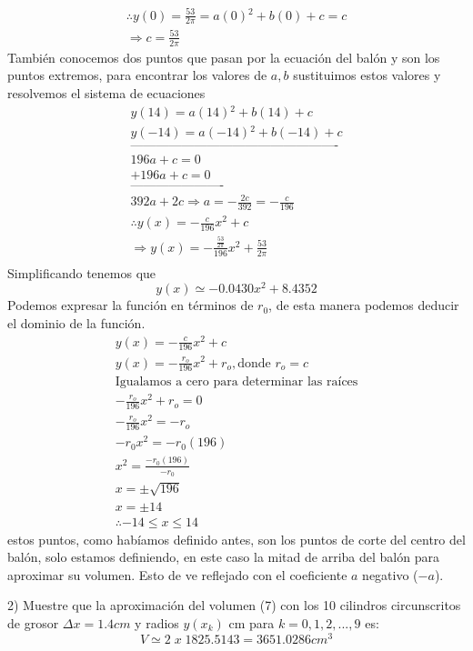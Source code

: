 \begin{gather*}
\therefore y(0)=\frac{53}{2\pi}=a(0){^2}+b(0)+c=c\\
\Rightarrow c=\frac{53}{2\pi}
\end{gather*}
También conocemos dos puntos que pasan por la ecuación del balón y son los puntos extremos, para encontrar los valores de $a,b$ sustituimos estos valores y resolvemos el sistema de ecuaciones
\begin{gather*}
y(14)=a(14){^2}+b(14)+c\\
y(-14)=a(-14){^2}+b(-14)+c\\
\text{-------------------------------------------------}\\
196a+c=0\\
+196a+c=0\\
\text{----------------------}\\
392a+2c\Rightarrow a=-\frac{2c}{392}=-\frac{c}{196}\\
\therefore y(x)=-\frac{c}{196}x{^2}+c\\
\Rightarrow y(x)=-\frac{\frac{53}{2\pi}}{196}x{^2}+\frac{53}{2\pi}\\
\end{gather*}
Simplificando tenemos que $$y(x)\simeq-0.0430x{^2}+8.4352$$
Podemos expresar la función en términos de $r_0$, de esta manera podemos deducir el dominio de la función.
\begin{gather*}
y(x)=-\frac{c}{196}x{^2}+c\\
y(x)=-\frac{r_{o}}{196}x{^2}+r_{o},\text{donde }r_o=c\\
\text{Igualamos a cero para determinar las raíces}\\
-\frac{r_{o}}{196}x{^2}+r_{o}=0\\
-\frac{r_{o}}{196}x{^2}=-r_{o}\\
-r_{0}x{^2}=-r_{0}(196)\\
x{^2}=\frac{-r_{0}(196)}{-r_{0}}\\
x=\pm \sqrt{196}\\
x=\pm 14\\
\therefore-14\leq x\leq 14
\end{gather*}
estos puntos, como habíamos definido antes, son los puntos de corte del centro del balón, solo estamos definiendo, en este caso la mitad de arriba del balón para aproximar su volumen. Esto de ve reflejado con el coeficiente $a$ negativo ($-a$).

2) Muestre que la aproximación del volumen (7) con los 10 cilindros circunscritos de grosor $\Delta x = 1.4 cm$ y radios $y(x_{k})$ cm para $k = 0, 1, 2, . . . , 9$ es:
$$V\simeq 2 \; x \;1825.5143=3651.0286 cm^3$$

